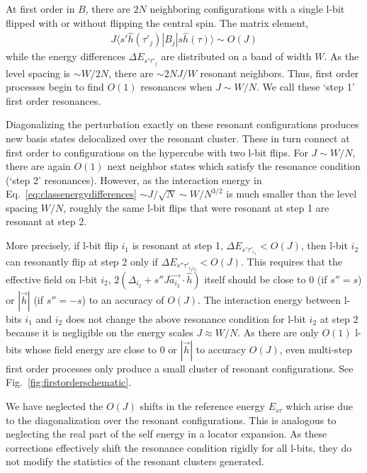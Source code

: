 \documentclass[aps,pra,twocolumn,a4paper,showpacs,superscriptaddress,floatfix,10pt]{revtex4}
\begin{document}
At first order in $B$, there are $2N$ neighboring configurations with a single l-bit flipped with or without flipping the central spin. The matrix element,
\begin{align}
	J\langle s' \hat{h}(\tau'_j)|B_j|s\hat{h}(\tau)\rangle \sim O(J)
\end{align}
while the energy differences $\Delta E_{s'\tau'_{j}}$ are distributed on a band of width $W$.
As the level spacing is $\sim W/2N$, there are $\sim 2 N J / W$ resonant neighbors.
Thus, first order processes begin to find $O(1)$ resonances when $J \sim W/N$.
We call these `step 1' first order resonances.

Diagonalizing the perturbation exactly on these resonant configurations produces new basis states delocalized over the resonant cluster.
These in turn connect at first order to configurations on the hypercube with two l-bit flips.
For $J \sim W/N$, there are again $O(1)$ next neighbor states which satisfy the resonance condition (`step 2' resonances).
However, as the interaction energy in Eq.~\eqref{eq:classenergydifferences} $\sim J/\sqrt{N} \sim W / N^{3/2}$ is much smaller than the level spacing $W/N$, roughly the same l-bit flips that were resonant at step 1 are resonant at step 2.
%

More precisely, if l-bit flip $i_1$ is resonant at step 1, $\Delta E_{s'\tau'_{i_1}} < O(J)$, then l-bit $i_2$ can resonantly flip at step 2 only if $\Delta E_{s''\tau'_{i_1i_2}} < O(J)$.
This requires that the effective field on l-bit $i_2$, $2\left(\Delta_{i_2} + s'' J \vec{a_{i_2}}\cdot \hat{h}\right)$ itself should be close to $0$ (if $s''=s$) or $|\vec{h}|$ (if $s''=-s$) to an accuracy of $O(J)$.
The interaction energy between l-bits $i_1$ and $i_2$ does not change the above resonance condition for l-bit $i_2$ at step 2 because it is negligible on the energy scales $J \approx W/N$.
As there are only $O(1)$ l-bits whose field energy are close to $0$ or $|\vec{h}|$ to accuracy $O(J)$, even multi-step first order processes only produce a small cluster of resonant configurations. See Fig.~\ref{fig:firstorderschematic}.

We have neglected the $O(J)$ shifts in the reference energy $E_{s\tau}$ which arise due to the diagonalization over the resonant configurations. This is analogous to neglecting the real part of the self energy in a locator expansion.
As these corrections effectively shift the resonance condition rigidly for all l-bits, they do not modify the statistics of the resonant clusters generated.
\end{document}
